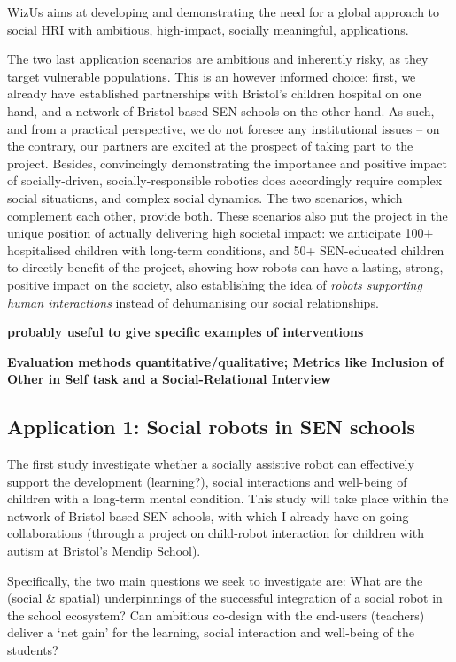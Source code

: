 \documentclass[11pt,a4paper]{report}
\newcommand{\project}{WizUs\xspace}
\newcommand{\TODO}[1]{{\color{red}\textbf{#1}}}
\begin{document}
\project aims at developing and demonstrating the need for a global approach to
social HRI with ambitious, high-impact, socially meaningful, applications.

The two last application scenarios are ambitious and inherently risky, as they
target vulnerable populations. This is an however informed choice: first, we
already have established partnerships with Bristol's children hospital on one
hand, and a network of Bristol-based SEN schools on the other hand. As such, and
from a practical perspective, we do not foresee any institutional issues -- on
the contrary, our partners are excited at the prospect of taking part to the
project. Besides, convincingly demonstrating the importance and positive impact
of socially-driven, socially-responsible robotics does accordingly require
complex social situations, and complex social dynamics. The two scenarios, which
complement each other, provide both. These scenarios also put the project in the
unique position of actually delivering high societal impact: we anticipate 100+
hospitalised children with long-term conditions, and 50+ SEN-educated children
to directly benefit of the project, showing how robots can have a lasting,
strong, positive impact on the society, also establishing the idea of
\emph{robots supporting human interactions} instead of dehumanising our social
relationships.


\TODO{probably useful to give specific examples of interventions}

\TODO{Evaluation methods quantitative/qualitative; Metrics like Inclusion of Other in Self task
and a Social-Relational Interview~\cite{westlund2017measuring}}

\subsection{Application 1: Social robots in SEN schools}


The first study investigate whether a socially assistive robot can effectively support the development (learning?),
social interactions and well-being of children with a long-term mental
condition. This study will take place within the network of
Bristol-based SEN schools, with which I already have on-going collaborations
(through a project on child-robot interaction for children with autism at Bristol's Mendip School).


Specifically, the two main questions we seek to investigate are: What are the
(social \& spatial) underpinnings of the successful integration of a social
robot in the school ecosystem? Can ambitious co-design with the end-users
(teachers) deliver a `net gain' for the learning, social interaction and
well-being of the students? 
\end{document}
